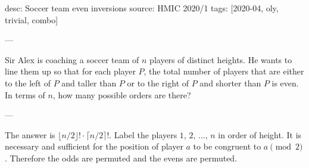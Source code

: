 desc: Soccer team even inversions
source: HMIC 2020/1
tags: [2020-04, oly, trivial, combo]

---

Sir Alex is coaching a soccer team of $n$ players of distinct heights. He wants to line them up so that for each player $P$, the total number of players that are either to the left of $P$ and taller than $P$ or to the right of $P$ and shorter than $P$ is even. In terms of $n$, how many possible orders are there?

---

The answer is $\lfloor n/2\rfloor!\cdot\lceil n/2\rceil!$. Label the players $1$, $2$, $\ldots$, $n$ in order of height. It is necessary and sufficient for the position of player $a$ to be congruent to $a\pmod2$. Therefore the odds are permuted and the evens are permuted.
